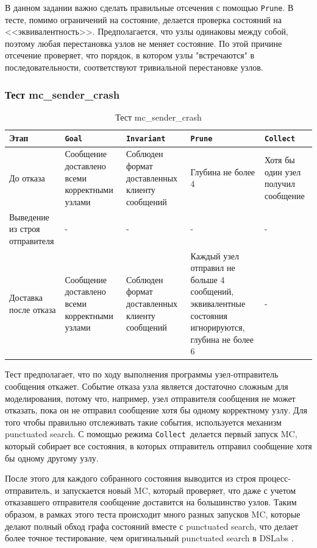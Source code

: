 \documentclass[a4paper,12pt]{extarticle}
\newcommand{\goal}[0]{\texttt{Goal}}
\newcommand{\prune}[0]{\texttt{Prune}}
\newcommand{\invariant}[0]{\texttt{Invariant}}
\newcommand{\collect}[0]{\texttt{Collect}}
\newcommand{\mc}[0]{MC}
\begin{document}
В данном задании важно сделать правильные отсечения с помощью \prune.
В тесте, помимо ограничений на состояние, делается проверка состояний на <<эквивалентность>>.
Предполагается, что узлы одинаковы между собой, поэтому любая перестановка узлов не меняет состояние.
По этой причине отсечение проверяет, что порядок, в котором узлы "встречаются" в последовательности, соответствуют тривиальной перестановке узлов.

\subsubsection{Тест mc\_sender\_crash}

\begin{table}[htbp]
    \caption{Тест mc\_sender\_crash}
    \begin{center}
    \begin{tabular}{|p{}|p{}|p{}|p{}|p{} |}
    \hline
    Этап & \goal & \invariant & \prune & \collect \\
    \hline
    До отказа & Сообщение доставлено всеми корректными узлами & Соблюден формат доставленных клиенту сообщений & Глубина не более 4 & Хотя бы один узел получил сообщение \\
    \hline
    Выведение из строя отправителя & - & - & - & -\\
    \hline
    Доставка после отказа  & Сообщение доставлено всеми корректными узлами & Соблюден формат доставленных клиенту сообщений & Каждый узел отправил не больше 4 сообщений, эквивалентные состояния игнорируются, глубина не более 6 & - \\
    \hline
    \end{tabular}
    \label{testsbroadcast_2}
    \end{center}
\end{table}


Тест предполагает, что по ходу выполнения программы узел-отправитель сообщения откажет.
Событие отказа узла является достаточно сложным для моделирования, потому что, например, узел отправителя сообщения не может отказать, пока он не отправил сообщение хотя бы одному корректному узлу.
Для того чтобы правильно отслеживать такие события, используется механизм punctuated search.
С помощью режима \collect\ делается первый запуск \mc, который собирает все состояния, в которых отправитель отправил сообщение хотя бы одному другому узлу.

После этого для каждого собранного состояния выводится из строя процесс-отправитель, и запускается новый \mc, который проверяет, что даже с учетом отказавшего отправителя сообщение доставится на большинство узлов.
Таким образом, в рамках этого теста происходит много разных запусков \mc, которые делают полный обход графа состояний вместе с punctuated search, что делает более точное тестирование, чем оригинальный punctuated search в DSLabs \cite{b1}.
\end{document}
